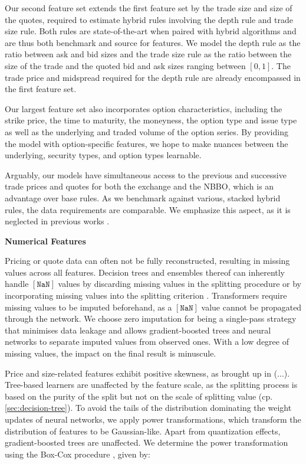 Our second feature set extends the first feature set by the trade size and size of the quotes, required to estimate hybrid rules involving the depth rule and trade size rule. Both rules are state-of-the-art when paired with hybrid algorithms and are thus both benchmark and source for features. We model the depth rule as the ratio between ask and bid sizes and the trade size rule as the ratio between the size of the trade and the quoted bid and ask sizes ranging between $\left[0,1\right]$. The trade price and midspread required for the depth rule are already encompassed in the first feature set.

Our largest feature set also incorporates option characteristics, including the strike price, the time to maturity, the moneyness, the option type and issue type as well as the underlying and traded volume of the option series. By providing the model with option-specific features, we hope to make nuances between the underlying, security types, and option types learnable.

Arguably, our models have simultaneous access to the previous and successive trade prices and quotes for both the exchange and the NBBO, which is an advantage over base rules. As we benchmark against various, stacked hybrid rules, the data requirements are comparable. We emphasize this aspect, as it is neglected in previous works \autocites[][485]{blazejewskiLocalNonParametricModel2005}[][48]{ronenMachineLearningTrade2022}[][9]{rosenthalModelingTradeDirection2012}.

\textbf{Numerical Features}

Pricing or quote data can often not be fully reconstructed, resulting in missing values across all features. Decision trees and ensembles thereof can inherently handle $\mathtt{[NaN]}$ values by discarding missing values in the splitting procedure \autocite[][150--152]{breimanClassificationRegressionTrees2017} or by incorporating missing values into the splitting criterion \autocite[][951]{twalaGoodMethodsCoping2008}. Transformers require missing values to be imputed beforehand, as a $\mathtt{[NaN]}$ value cannot be propagated through the network. We choose zero imputation for being a single-pass strategy that minimises data leakage and allows gradient-boosted trees and neural networks to separate imputed values from observed ones. With a low degree of missing values, the impact on the final result is minuscule.

Price and size-related features exhibit positive skewness, as brought up in (...). Tree-based learners are unaffected by the feature scale, as the splitting process is based on the purity of the split but not on the scale of splitting value (cp. \cref{sec:decision-tree}). To avoid the tails of the distribution dominating the weight updates of neural networks, we apply power transformations, which transform the distribution of features to be Gaussian-like. Apart from quantization effects, gradient-boosted trees are unaffected. We determine the power transformation using the Box-Cox procedure \autocite[][214]{boxAnalysisTransformations2022}, given by:

